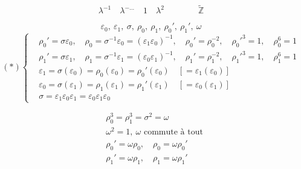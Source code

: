 \documentclass[11pt,a4paper]{article}
\begin{document}


\[
\lambda^{-1} \quad \lambda^{-\ldots} \quad 1 \quad \lambda^2 \qquad\qquad
\widetilde{\mathbb{Z}}
\]

\[
\varepsilon_0, \ \varepsilon_1, \ \sigma, \ \rho_0, \ \rho_1, \ \rho_0', \ \rho_1', \ \omega
\]
\[
(*)\left\{
\begin{aligned}
&\rho_0' = \sigma \varepsilon_0, \quad \rho_0 = \sigma^{-1}\varepsilon_0 = (\varepsilon_1 \varepsilon_0)^{-1},
\quad \rho_0' = \rho_0^{-2}, \quad \rho_0'^3 = 1, \quad \rho_0^6 = 1 \\
&\rho_1' = \sigma \varepsilon_1, \quad \rho_1 = \sigma^{-1}\varepsilon_1 = (\varepsilon_0 \varepsilon_1)^{-1},
\quad \rho_1' = \rho_1^{-2}, \quad \rho_1'^3 = 1, \quad \rho_1^6 = 1 \\
&\varepsilon_1 = \sigma(\varepsilon_0) = \rho_0(\varepsilon_0) = \rho_0'(\varepsilon_0)
\quad [= \varepsilon_1(\varepsilon_0)] \\
&\varepsilon_0 = \sigma(\varepsilon_1) = \rho_1(\varepsilon_1) = \rho_1'(\varepsilon_1)
\quad [= \varepsilon_0(\varepsilon_1)] \\
&\sigma = \varepsilon_1 \varepsilon_0 \varepsilon_1 = \varepsilon_0 \varepsilon_1 \varepsilon_0
\end{aligned}
\right.
\]

\[
\begin{aligned}
&\rho_0^3 = \rho_1^3 = \sigma^2 = \omega \\
&\omega^2 = 1, \ \omega \text{ commute à tout} \\
&\rho_0' = \omega \rho_0, \quad \rho_0 = \omega \rho_0' \\
&\rho_1' = \omega \rho_1, \quad \rho_1 = \omega \rho_1'
\end{aligned}
\]
\end{document}
